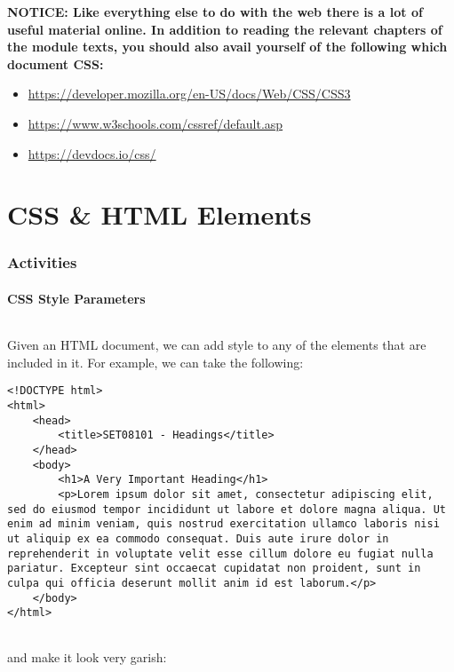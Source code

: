 \documentclass[10pt, a4paper, twosize]{article}
\begin{document}
\begin{framed}
{\bf{NOTICE:} Like everything else to do with the web there is a lot of useful material online. In addition to reading the relevant chapters of the module texts, you should also avail yourself of the following which document CSS:
\begin{itemize}
\item \url{https://developer.mozilla.org/en-US/docs/Web/CSS/CSS3}
\item \url{https://www.w3schools.com/cssref/default.asp}
\item \url{https://devdocs.io/css/}
\end{itemize}

}
\end{framed}

\clearpage
\part{CSS \& HTML Elements}

\section*{Activities}

\subsection*{CSS Style Parameters}
\paragraph{} Given an HTML document, we can add style to any of the elements that are included in it. For example, we can take the following:

\begin{lstlisting}
<!DOCTYPE html>
<html>
    <head>
        <title>SET08101 - Headings</title>
    </head>
    <body>
        <h1>A Very Important Heading</h1>
        <p>Lorem ipsum dolor sit amet, consectetur adipiscing elit, sed do eiusmod tempor incididunt ut labore et dolore magna aliqua. Ut enim ad minim veniam, quis nostrud exercitation ullamco laboris nisi ut aliquip ex ea commodo consequat. Duis aute irure dolor in reprehenderit in voluptate velit esse cillum dolore eu fugiat nulla pariatur. Excepteur sint occaecat cupidatat non proident, sunt in culpa qui officia deserunt mollit anim id est laborum.</p>
    </body>
</html>
\end{lstlisting}

\paragraph{} and make it look very garish:
\end{document}
